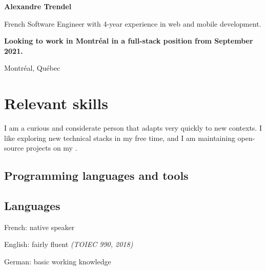 \documentclass{cv}
\begin{document}
\pagestyle{empty}

\noindent\begin{minipage}[t]{0.5\textwidth}

	\noindent\textbf{\color{solviolet} \LARGE Alexandre Trendel}\medskip
	
	French Software Engineer with 4-year experience in web and mobile development. \smallskip
	
	\textbf{Looking to work in Montréal in a full-stack position from September 2021.}

	\smallskip\noindent{\color{solviolet}\rule{3cm}{1.5pt}}
\end{minipage}\hfill%
\begin{minipage}[t]{0.3\textwidth}
	
	 Montréal, Québec
	\newline{} %
	\newline{} \href{mailto:%
	}{\link{%
	}}%
	\newline{} \href{https://github.com/xou816}{} 
	
\end{minipage}

\section{Relevant skills}

I am a curious and considerate person that adapts very quickly to new contexts. I like exploring new technical stacks in my free time, and I am maintaining open-source projects on my \href{https://github.com/xou816}{}.

\noindent%
\begin{minipage}[t]{0.4\textwidth}
	\subsection{Programming languages and tools}
	\begin{center}
		   
		  
		 
		  
	\end{center}
\end{minipage}\hfill%
\begin{minipage}[t]{0.45\textwidth}
	\subsection{Languages}
	French: native speaker

	English: fairly fluent {\itshape (TOIEC 990, 2018)}

	German: basic working knowledge
\end{minipage}
\end{document}
